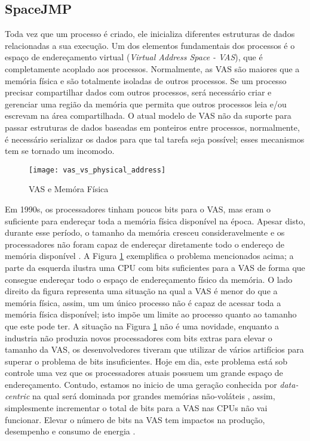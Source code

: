 \subsection{SpaceJMP}
\label{sec:mvas}

Toda vez que um processo é criado, ele inicializa diferentes estruturas de
dados relacionadas a sua execução. Um dos elementos fundamentais dos processos
é o espaço de endereçamento virtual (\emph{Virtual Address Space - VAS}), que é
completamente acoplado aos processos. Normalmente, as VAS são maiores que a
memória física e são totalmente isoladas de outros processos. Se um processo
precisar compartilhar dados com outros processos, será necessário criar e
gerenciar uma região da memória que permita que outros processos leia e/ou
escrevam na área compartilhada. O atual modelo de VAS não da suporte para
passar estruturas de dados baseadas em ponteiros entre processos, normalmente,
é necessário serializar os dados para que tal tarefa seja possível; esses
mecanismos tem se tornado um incomodo.

\begin{figure}[!h]
  \centering
  \texttt{[image: vas\_vs\_physical\_address]} 
  \caption{VAS e Memóra Física}
  \label{fig:vas_vs_physical} 
\end{figure}

Em 1990s, os processadores tinham poucos bits para o VAS, mas eram o suficiente
para endereçar toda a memória física disponível na época. Apesar disto, durante
esse período, o tamanho da memória cresceu consideravelmente e os processadores
não foram capaz de endereçar diretamente todo o endereço de memória disponível
\cite{crowley}. A Figura \ref{fig:vas_vs_physical} exemplifica o problema
mencionados acima; a parte da esquerda ilustra uma CPU com bits suficientes
para a VAS de forma que consegue endereçar todo o espaço de endereçamento
físico da memória. O lado direito da figura representa uma situação na qual a
VAS é menor do que a memória física, assim, um um único processo não é capaz de
acessar toda a memória física disponível; isto impõe um limite ao processo
quanto ao tamanho que este pode ter. A situação na Figura
\ref{fig:vas_vs_physical} não é uma novidade, enquanto a industria não produzia
novos processadores com bits extras para elevar o tamanho da VAS, os
desenvolvedores tiveram que utilizar de vários artifícios para superar o
problema de bits insuficientes. Hoje em dia, este problema está sob controle
uma vez que os processadores atuais possuem um grande espaço de endereçamento.
Contudo, estamos no inicio de uma geração conhecida por \emph{data-centric} na
qual será dominada por grandes memórias não-voláteis \citep{outlook}, assim,
simplesmente incrementar o total de bits para a VAS nas CPUs não vai funcionar.
Elevar o número de bits na VAS tem impactos na produção, desempenho e consumo
de energia \citep{spacejmp}.

